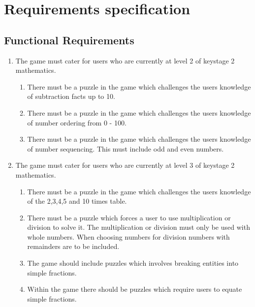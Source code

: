\chapter{Requirements specification}

\section{Functional Requirements}
\begin{enumerate}

	\item The game must cater for users who are currently at level 2 of keystage 2 mathematics.
	\begin{enumerate}[label={1.\arabic*},nolistsep,leftmargin=*]
		\item There must be a puzzle in the game which challenges the users knowledge of subtraction facts up to 10.
		\item There must be a puzzle in the game which challenges the users knowledge of number ordering from 0 - 100.
		\item There must be a puzzle in the game which challenges the users knowledge of number sequencing. This must include odd and even numbers.
	\end{enumerate}

	\item The game must cater for users who are currently at level 3 of keystage 2 mathematics.
	\begin{enumerate}[label={2.\arabic*},nolistsep,leftmargin=*]
		\item There must be a puzzle in the game which challenges the users knowledge of the 2,3,4,5 and 10 times table.
		\item There must be a puzzle which forces a user to use multiplication or division to solve it. The multiplication or division must only be used with whole numbers. When choosing numbers for division numbers with remainders are to be included.	
		\item The game should include puzzles which involves breaking entities into simple fractions.
		\item Within the game there should be puzzles which require users to equate simple fractions.
	\end{enumerate}
	

\end{enumerate}

